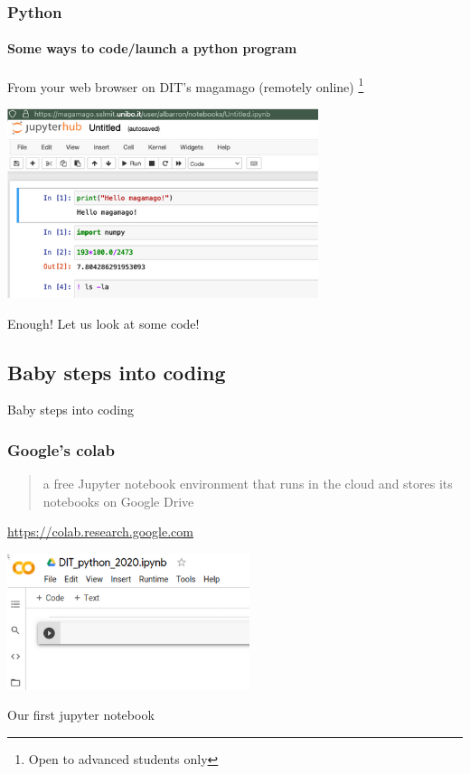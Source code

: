 \documentclass{beamer}
\newcommand{\light}[1]{\textcolor{gray}{#1}}
\begin{document}
\begin{frame}
\frametitle{Python}
\framesubtitle{Some ways to code/launch a python program}

From your web browser on DIT’s magamago (remotely online)%
\footnote{Open to advanced students only}

\begin{center}
 \includegraphics[width=91mm]{img/python_on_magamago.png}
\end{center}
\end{frame}

\begin{frame}

\begin{center}
 \alert{Enough! Let us look at some code!}
\end{center}
\end{frame}

\begin{frame}
\section{Baby steps into coding}
\centering
\alert{Baby steps into coding}
\end{frame}

\begin{frame}
\frametitle{Google’s colab}

\begin{quote}
a free Jupyter notebook environment that runs in the cloud and stores its 
notebooks on Google Drive
\end{quote}

\begin{flushright}
\light{\url{https://colab.research.google.com}}
\end{flushright}				\pause 

\begin{center}
 \includegraphics[width=71mm]{img/jupyter_dit.png}
\end{center}

Our first jupyter notebook
\end{frame}
\end{document}
